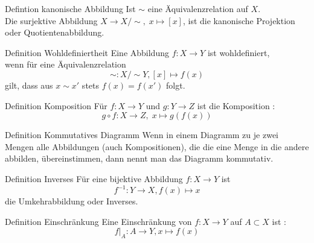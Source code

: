 \documentclass[a6paper,11pt,print,grid=front]{kartei/kartei}
\begin{document}
\begin{karte}{Defintion kanonische Abbildung}
    Ist \(\sim\) eine Äquivalenzrelation auf \(X\). \\
    Die surjektive Abbildung \(X \rightarrow X / \sim, \; x \mapsto [x]\), 
    ist die kanonische Projektion oder Quotientenabbildung. 
\end{karte}
\begin{karte}{Definition Wohldefiniertheit}
    Eine Abbildung \(f: X \rightarrow Y\) ist wohldefiniert, \\
    wenn für eine Äquivalenzrelation 
    \[\sim : X / \sim Y, [x] \mapsto f(x)\] 
    gilt, dass aus \(x \sim x\prime \) stets \(f(x) = f(x \prime)\) folgt. 
\end{karte}
\begin{karte}{Definition Komposition}
    Für \(f: X \rightarrow Y\) und \(g: Y \rightarrow Z\) ist 
    die Komposition :
    \[g \circ f : X \rightarrow Z,\; x \mapsto g(f(x))\]
\end{karte}
\begin{karte}{Definition Kommutatives Diagramm}
    Wenn in einem Diagramm zu je zwei Mengen alle Abbildungen 
    (auch Kompositionen), die die eine Menge in die andere abbilden,
    übereinstimmen, dann nennt man das Diagramm kommutativ. 
\end{karte}
\begin{karte}{Definition Inverses}
    Für eine bijektive Abbildung \(f: X \rightarrow Y\) ist
    \[f^{-1}: Y \rightarrow X, f(x) \mapsto x\] 
    die Umkehrabbildung oder Inverses.
\end{karte}
\begin{karte}{Definition Einschränkung}
    Eine Einschränkung von \(f: X \rightarrow Y\) 
    auf \(A \subset X\) ist : \\
    \[f \vert_A : A \rightarrow Y, x \mapsto f(x)\]
\end{karte}
\end{document}
